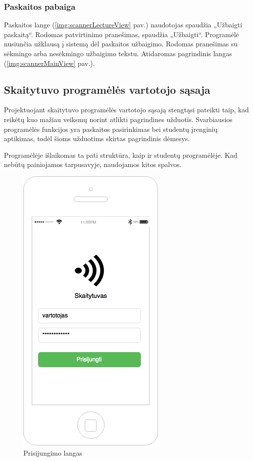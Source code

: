 \documentclass{VUMIFPSbakalaurinis}
\begin{document}
\subsubsection{Paskaitos pabaiga}

Paskaitos lange (\ref{img:scannerLectureView} pav.) naudotojas spaudžia „Užbaigti paskaitą“. Rodomas patvirtinimo pranešimas, spaudžia „Užbaigti“. Programėlė nusiunčia užklausą į sistemą dėl paskaitos užbaigimo. Rodomas pranešimas su sėkmingo arba nesėkmingo užbaigimo tekstu. Atidaromas pagrindinis langas (\ref{img:scannerMainView} pav.).

\subsection{Skaitytuvo programėlės vartotojo sąsaja}

Projektuojant skaitytuvo programėlės vartotojo sąsają stengtąsi pateikti taip, kad reikėtų kuo mažiau veiksmų norint atlikti pagrindines užduotis. Svarbiausios programėlės funkcijos yra paskaitos pasirinkimas bei studentų įrenginių aptikimas, todėl šioms užduotims skirtas pagrindinis dėmesys.

Programėlėje išlaikomas ta pati struktūra, kaip ir studentų programėlėje. Kad nebūtų painiojamos tarpusavyje, naudojamos kitos spalvos.

\begin{figure}[H]
	\centering
	\includegraphics[scale=0.5]{img/kursinio_app_dest_login}
	\caption{Prisijungimo langas}
	\label{img:scannerLoginView}
\end{figure}
\end{document}
